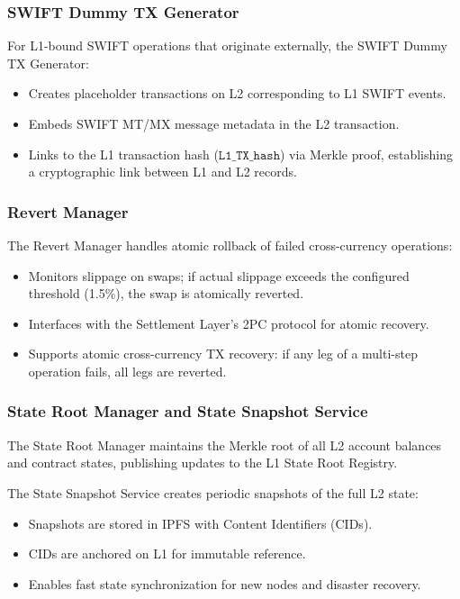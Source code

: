 \documentclass[12pt,a4paper]{article}
\theoremstyle{definition}
\theoremstyle{remark}
\begin{document}
\subsubsection{SWIFT Dummy TX Generator}

For L1-bound SWIFT operations that originate externally, the SWIFT Dummy TX Generator:
\begin{itemize}[nosep]
    \item Creates placeholder transactions on L2 corresponding to L1 SWIFT events.
    \item Embeds SWIFT MT/MX message metadata in the L2 transaction.
    \item Links to the L1 transaction hash ($\texttt{L1\_TX\_hash}$) via Merkle proof, establishing a cryptographic link between L1 and L2 records.
\end{itemize}

\subsubsection{Revert Manager}
\label{sec:revert-manager}

The Revert Manager handles atomic rollback of failed cross-currency operations:
\begin{itemize}[nosep]
    \item Monitors slippage on swaps; if actual slippage exceeds the configured threshold (1.5\%), the swap is atomically reverted.
    \item Interfaces with the Settlement Layer's 2PC protocol for atomic recovery.
    \item Supports atomic cross-currency TX recovery: if any leg of a multi-step operation fails, all legs are reverted.
\end{itemize}

\subsubsection{State Root Manager and State Snapshot Service}

The State Root Manager maintains the Merkle root of all L2 account balances and contract states, publishing updates to the L1 State Root Registry.

The State Snapshot Service creates periodic snapshots of the full L2 state:
\begin{itemize}[nosep]
    \item Snapshots are stored in IPFS with Content Identifiers (CIDs).
    \item CIDs are anchored on L1 for immutable reference.
    \item Enables fast state synchronization for new nodes and disaster recovery.
\end{itemize}
\end{document}
